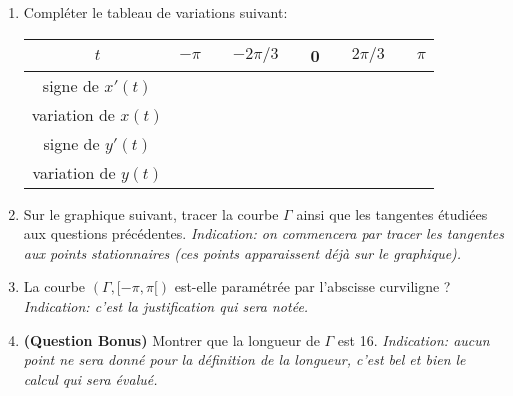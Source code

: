 \documentclass[a4paper]{tp_um}
\begin{document}
\begin{enumerate}
		\item Compléter le tableau de variations suivant:
			\begin{center}
				\begin{tabular}{|c|ccccccccc|}
					\hline    $t$       & $-\pi$ & \hspace{1.5cm}  & $-2\pi/3$ & \hspace{1.5cm}  &  0	& \hspace{1.5cm} & $2\pi/3$ & \hspace{1.5cm}   & $\pi$\\[0.3cm]\hline\hline
					signe de $x'(t)$     &     &   & & & & & &            &	\\[0.4cm]\hline
					variation de $x(t)$ &     &     & & & & & &          &	\\[0.9cm]\hline\hline
					signe de $y'(t)$     &     &         & & & & & &      &	\\[0.4cm]\hline
					variation de $y(t)$ &     &          & & & & & &     &	\\[0.9cm]\hline
				\end{tabular}
			\end{center}
		\item  Sur le graphique suivant, tracer la courbe $\Gamma$ ainsi que les tangentes étudiées aux questions précédentes. {\it Indication: on commencera par tracer les tangentes aux points stationnaires (ces points apparaissent déjà sur le graphique).}
				\begin{center}
			\end{center}

		\item La courbe $(\Gamma,[-\pi,\pi[)$ est-elle paramétrée par l'abscisse curviligne ?  {\it Indication: c'est la justification qui sera notée.}

			\blanc{6cm}

		\item {\bf\sffamily (Question Bonus)} Montrer que  la longueur de $\Gamma$ est 16. {\it Indication: aucun point ne sera donné pour la définition de la longueur, c'est bel et bien le calcul qui sera évalué.}

			\blanc{5cm}
	\end{enumerate}
 
\end{document}
